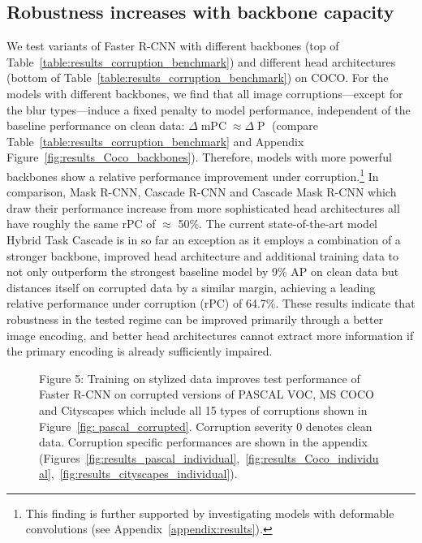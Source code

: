 \documentclass{article}
\begin{document}
\subsection{Robustness increases with backbone capacity}
We test variants of Faster R-CNN with different backbones (top of Table~\ref{table:results_corruption_benchmark}) and different head architectures (bottom of Table~\ref{table:results_corruption_benchmark}) on COCO. For the models with different backbones, we find that all image corruptions---except for the blur types---induce a fixed penalty to model performance, independent of the baseline performance on clean data: $\Delta\operatorname{mPC}\approx\Delta\operatorname{P}$ (compare Table~\ref{table:results_corruption_benchmark} and Appendix Figure~\ref{fig:results_Coco_backbones}). Therefore, models with more powerful backbones show a relative performance improvement under corruption.\footnote{This finding is further supported by investigating models with deformable convolutions (see Appendix~\ref{appendix:results}).} 
In comparison, Mask R-CNN, Cascade R-CNN and Cascade Mask R-CNN which draw their performance increase from more sophisticated head architectures all have roughly the same rPC of $\approx$ 50\%. 
The current state-of-the-art model Hybrid Task Cascade \citep{Chen2019hybrid} is in so far an exception as it employs a combination of a stronger backbone, improved head architecture and additional training data to not only outperform the strongest baseline model by 9\% AP on clean data but distances itself on corrupted data by a similar margin, achieving a leading relative performance under corruption (rPC) of 64.7\%.
These results indicate that robustness in the tested regime can be improved primarily through a better image encoding, and better head architectures cannot extract more information if the primary encoding is already sufficiently impaired.

\begin{figure}[t!]
\captionsetup[subfigure]{justification=centering}
	\centering
	\vspace{-0.15cm}
	\caption{Figure 5: Training on stylized data improves test performance of Faster R-CNN on corrupted versions of PASCAL VOC, MS COCO and Cityscapes which include all 15 types of corruptions shown in Figure~\ref{fig: pascal_corrupted}. Corruption severity 0 denotes clean data. Corruption specific performances are shown in the appendix (Figures~\ref{fig:results_pascal_individual},~\ref{fig:results_Coco_individual},~\ref{fig:results_cityscapes_individual}).
}
	\label{fig:results_combined}
	\vspace{-0.2cm}
\end{figure}
\end{document}
